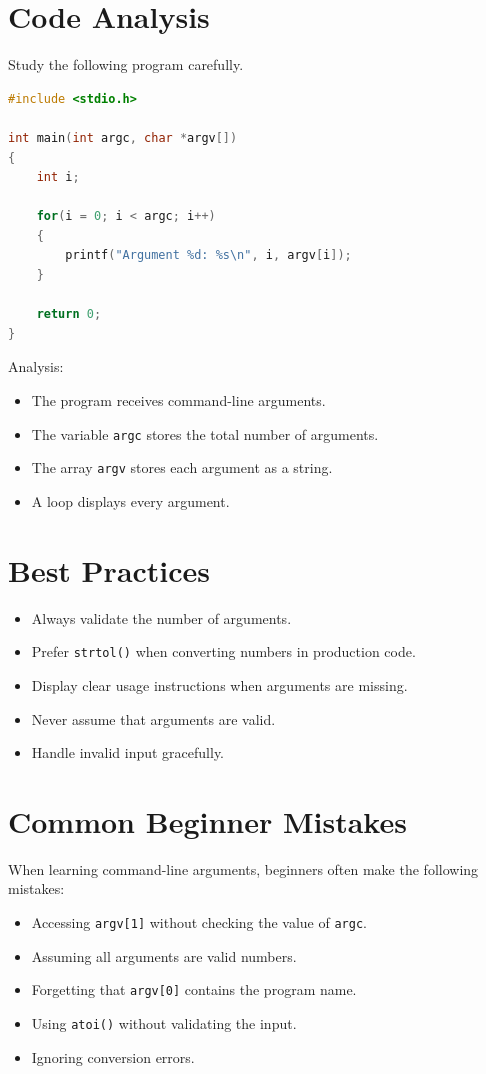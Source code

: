 \documentclass[12pt,openany]{book}
\begin{document}
\section{Code Analysis}

Study the following program carefully.

\begin{lstlisting}[language=C]
#include <stdio.h>

int main(int argc, char *argv[])
{
    int i;

    for(i = 0; i < argc; i++)
    {
        printf("Argument %d: %s\n", i, argv[i]);
    }

    return 0;
}
\end{lstlisting}

Analysis:

\begin{itemize}
    \item The program receives command-line arguments.
    \item The variable \texttt{argc} stores the total number of arguments.
    \item The array \texttt{argv} stores each argument as a string.
    \item A loop displays every argument.
\end{itemize}

\section{Best Practices}

\begin{itemize}
    \item Always validate the number of arguments.
    \item Prefer \texttt{strtol()} when converting numbers in production code.
    \item Display clear usage instructions when arguments are missing.
    \item Never assume that arguments are valid.
    \item Handle invalid input gracefully.
\end{itemize}
\section{Common Beginner Mistakes}

When learning command-line arguments, beginners often make the following mistakes:

\begin{itemize}
    \item Accessing \texttt{argv[1]} without checking the value of \texttt{argc}.
    \item Assuming all arguments are valid numbers.
    \item Forgetting that \texttt{argv[0]} contains the program name.
    \item Using \texttt{atoi()} without validating the input.
    \item Ignoring conversion errors.
\end{itemize}
\end{document}
